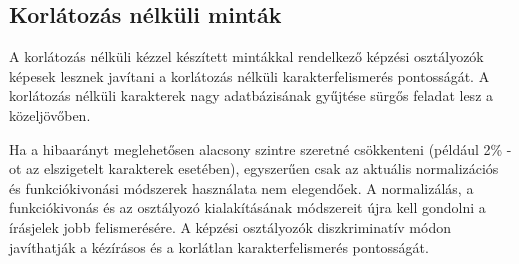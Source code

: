 \subsection{Korlátozás nélküli minták}
A korlátozás nélküli kézzel készített mintákkal rendelkező képzési osztályozók képesek lesznek javítani a korlátozás nélküli karakterfelismerés pontosságát. A korlátozás nélküli karakterek nagy adatbázisának gyűjtése sürgős feladat lesz a közeljövőben.

Ha a hibaarányt meglehetősen alacsony szintre szeretné csökkenteni (például 2\% -ot az elszigetelt karakterek esetében), egyszerűen csak az aktuális normalizációs és funkciókivonási módszerek használata nem elegendőek. A normalizálás, a funkciókivonás és az osztályozó kialakításának módszereit újra kell gondolni a írásjelek jobb felismerésére. A képzési osztályozók diszkriminatív módon javíthatják a kézírásos és a korlátlan karakterfelismerés pontosságát.